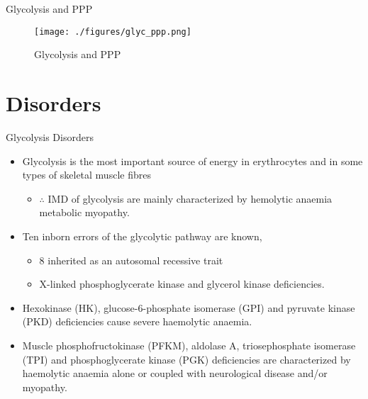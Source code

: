 \documentclass[presentation, smaller]{beamer}
\begin{document}
\begin{frame}[label={sec:org847db7a}]{Glycolysis and PPP}
\begin{figure}[htbp]
\centering
\texttt{[image: ./figures/glyc\_ppp.png]}
\caption{\label{fig:org3439777}
Glycolysis and PPP}
\end{figure}
\end{frame}

\section{Disorders}
\label{sec:orga3ac7c7}
\begin{frame}[label={sec:orgc0761d6}]{Glycolysis Disorders}
\begin{itemize}
\item Glycolysis is the most important source of energy in erythrocytes
and in some types of skeletal muscle fibres

\begin{itemize}
\item \(\therefore\) IMD of glycolysis are mainly characterized by hemolytic
anaemia \textpm{} metabolic myopathy.
\end{itemize}

\item Ten inborn errors of the glycolytic pathway are known,
\begin{itemize}
\item 8 inherited as an autosomal recessive trait
\item X-linked phosphoglycerate kinase and glycerol kinase deficiencies.
\end{itemize}

\item Hexokinase (HK), glucose-6-phosphate isomerase (GPI) and pyruvate
kinase (PKD) deficiencies cause severe haemolytic anaemia.

\item Muscle phosphofructokinase (PFKM), aldolase A, triosephosphate
isomerase (TPI) and phosphoglycerate kinase (PGK) deficiencies are
characterized by haemolytic anaemia alone or coupled with
neurological disease and/or myopathy.
\end{itemize}
\end{frame}
\end{document}
